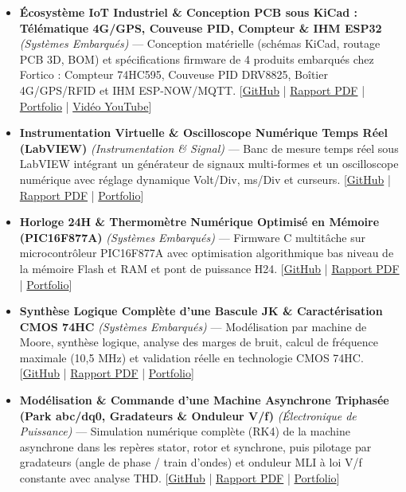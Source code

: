 \documentclass[10pt,a4paper]{article}
\begin{document}
\begin{itemize}
\item \textbf{Écosystème IoT Industriel \& Conception PCB sous KiCad : Télématique 4G/GPS, Couveuse PID, Compteur \& IHM ESP32} \textit{(Systèmes Embarqués)} --- Conception matérielle (schémas KiCad, routage PCB 3D, BOM) et spécifications firmware de 4 produits embarqués chez Fortico : Compteur 74HC595, Couveuse PID DRV8825, Boîtier 4G/GPS/RFID et IHM ESP-NOW/MQTT. [\href{https://github.com/scidelo-andriasahy/esp32-industrial-iot-pcb-kicad}{GitHub} | \href{https://scidelo-andriasahy.github.io/assets/pdfs/Schema_KiCad_Smart_Count_ESP32.pdf}{Rapport PDF} | \href{https://scidelo-andriasahy.github.io/?project=5}{Portfolio} | \href{https://youtu.be/-a-3MGmodos}{Vid\'eo YouTube}]
\item \textbf{Instrumentation Virtuelle \& Oscilloscope Numérique Temps Réel (LabVIEW)} \textit{(Instrumentation \& Signal)} --- Banc de mesure temps réel sous LabVIEW intégrant un générateur de signaux multi-formes et un oscilloscope numérique avec réglage dynamique Volt/Div, ms/Div et curseurs. [\href{https://github.com/scidelo-andriasahy/labview-virtual-oscilloscope-instrumentation}{GitHub} | \href{https://scidelo-andriasahy.github.io/assets/pdfs/RAPPORT_LABVIEW.pdf}{Rapport PDF} | \href{https://scidelo-andriasahy.github.io/?project=6}{Portfolio}]
\item \textbf{Horloge 24H \& Thermomètre Numérique Optimisé en Mémoire (PIC16F877A)} \textit{(Systèmes Embarqués)} --- Firmware C multitâche sur microcontrôleur PIC16F877A avec optimisation algorithmique bas niveau de la mémoire Flash et RAM et pont de puissance H24. [\href{https://github.com/scidelo-andriasahy/pic16f877a-clock-thermometer-optimized}{GitHub} | \href{https://scidelo-andriasahy.github.io/assets/pdfs/RAPPORT_H24_THERMO.pdf}{Rapport PDF} | \href{https://scidelo-andriasahy.github.io/?project=7}{Portfolio}]
\item \textbf{Synthèse Logique Complète d'une Bascule JK \& Caractérisation CMOS 74HC} \textit{(Systèmes Embarqués)} --- Modélisation par machine de Moore, synthèse logique, analyse des marges de bruit, calcul de fréquence maximale (10,5 MHz) et validation réelle en technologie CMOS 74HC. [\href{https://github.com/scidelo-andriasahy/jk-flipflop-cmos-74hc-synthesis}{GitHub} | \href{https://scidelo-andriasahy.github.io/assets/pdfs/Rapport_Bascule_JK_CMOS.pdf}{Rapport PDF} | \href{https://scidelo-andriasahy.github.io/?project=8}{Portfolio}]
\item \textbf{Modélisation \& Commande d'une Machine Asynchrone Triphasée (Park abc/dq0, Gradateurs \& Onduleur V/f)} \textit{(Électronique de Puissance)} --- Simulation numérique complète (RK4) de la machine asynchrone dans les repères stator, rotor et synchrone, puis pilotage par gradateurs (angle de phase / train d'ondes) et onduleur MLI à loi V/f constante avec analyse THD. [\href{https://github.com/scidelo-andriasahy/induction-motor-control-park-inverter-matlab}{GitHub} | \href{https://scidelo-andriasahy.github.io/assets/pdfs/Rapport_Commande_Machine_Asynchrone.pdf}{Rapport PDF} | \href{https://scidelo-andriasahy.github.io/?project=9}{Portfolio}]

\end{itemize}
\end{document}
